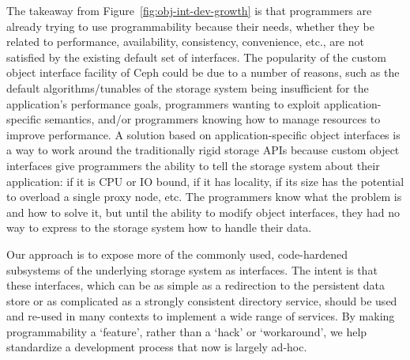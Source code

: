 \documentclass[preprint]{sigplanconf-eurosys}
\begin{document}
The takeaway from Figure~\ref{fig:obj-int-dev-growth} is that programmers are
already trying to use programmability because their needs, whether they be
related to performance, availability, consistency, convenience, etc., are not
satisfied by the existing default set of interfaces. The popularity of the custom object
interface facility of Ceph could be due to a number of reasons, such as the
default algorithms/tunables of the storage system being insufficient for the
application's performance goals, programmers wanting to exploit
application-specific semantics, and/or programmers knowing how to manage resources
to improve performance. A solution based on application-specific object
interfaces is a way to work around the
traditionally rigid storage APIs because custom object interfaces give
programmers the ability to tell the storage system about their application: if
it is CPU or IO bound, if it has locality, if its size has the potential to
overload a single proxy node, etc.  The programmers know what the problem is
and how to solve it, but until the ability to modify object interfaces, they
had no way to express to the storage system how to handle their data.

Our approach is to expose more of the commonly used, code-hardened subsystems
of the underlying storage system as interfaces. The intent is that these
interfaces, which can be as simple as a redirection to the persistent data
store or as complicated as a strongly consistent directory service, should be
used and re-used in many contexts to implement a wide range of services. By
making programmability a `feature', rather than a `hack' or `workaround', we
help standardize a development process that now is largely ad-hoc.

%
\end{document}

